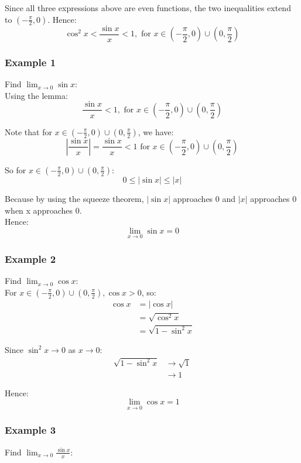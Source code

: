 \documentclass[11pt]{article}
\begin{document}
Since all three expressions above are even functions, the two inequalities extend to \((-\frac{\pi}{2}, 0)\). Hence:
\[\cos^2 x < \frac{\sin x}{x} < 1, \text{ for } x \in (- \frac{\pi}{2}, 0) \cup (0, \frac{\pi}{2})\]


\subsubsection{Example 1}
\label{sec:orgc1bc7cf}
Find \(\lim_{x \rightarrow 0} \sin x\):
\\[0pt]

Using the lemma:
\[\frac{\sin x}{x} < 1, \text{ for } x \in (-\frac{\pi}{2}, 0) \cup (0, \frac{\pi}{2})\]

Note that for \(x \in (-\frac{\pi}{2}, 0) \cup (0, \frac{\pi}{2})\), we have:
\[\left|\frac{\sin x}{x} \right| = \frac{\sin x}{x} < 1 \text{ for } x \in (-\frac{\pi}{2}, 0) \cup (0, \frac{\pi}{2})\]

So for \(x \in (-\frac{\pi}{2}, 0) \cup (0, \frac{\pi}{2})\):
\[0 \leq |\sin x| \leq |x|\]

Because by using the squeeze theorem, \(|\sin x|\) approaches 0 and \(|x|\) approaches 0 when x approaches 0.
\\[0pt]

Hence:
\[\lim_{x \rightarrow 0} \sin x = 0\]


\subsubsection{Example 2}
\label{sec:orga2776c2}
Find \(\lim_{x \rightarrow 0} \cos x\):
\\[0pt]

For \(x \in (-\frac{\pi}{2}, 0) \cup (0, \frac{\pi}{2}), \cos x > 0\), so:
\begin{align*}
\cos x &= |\cos x| \\
&= \sqrt{\cos^2 x} \\
&= \sqrt{1 - \sin^2 x}
\end{align*}

Since \(\sin^2 x \rightarrow 0\) as \(x \rightarrow 0\):
\begin{align*}
\sqrt{1 - \sin^2 x} &\rightarrow \sqrt{1} \\
&\rightarrow 1
\end{align*}

Hence:
\[\lim_{x \rightarrow 0} \cos x = 1\]


\subsubsection{Example 3}
\label{sec:org37b8921}
Find \(\lim_{x \rightarrow 0} \frac{\sin x}{x}\):
\\[0pt]
\end{document}
